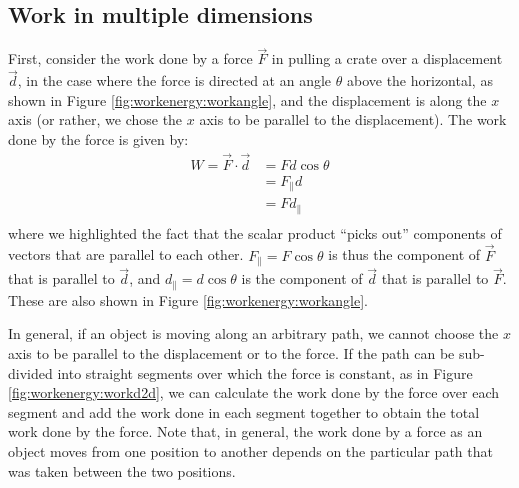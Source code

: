 \subsection{Work in multiple dimensions}
First, consider the work done by a force $\vec F$ in pulling a crate over a displacement $\vec d$, in the case where the force is directed at an angle $\theta$ above the horizontal, as shown in Figure \ref{fig:workenergy:workangle}, and the displacement is along the $x$ axis (or rather, we chose the $x$ axis to be parallel to the displacement).
The work done by the force is given by:
\begin{align*}
W = \vec F \cdot \vec d &= Fd\cos\theta\\
&= F_{\parallel}d\\
&= Fd_{\parallel}\\
\end{align*}
where we highlighted the fact that the scalar product ``picks out'' components of vectors that are parallel to each other. $F_{\parallel} = F\cos\theta$ is thus the component of $\vec F$ that is parallel to $\vec d$, and $d_{\parallel}=d\cos\theta$ is the component of $\vec d$ that is parallel to $\vec F$. These are also shown in Figure \ref{fig:workenergy:workangle}.

In general, if an object is moving along an arbitrary path, we cannot choose the $x$ axis to be parallel to the displacement or to the force. If the path can be sub-divided into straight segments over which the force is constant, as in Figure \ref{fig:workenergy:workd2d}, we can calculate the work done by the force over each segment and add the work done in each segment together to obtain the total work done by the force. Note that, in general, the work done by a force as an object moves from one position to another depends on the particular path that was taken between the two positions.

